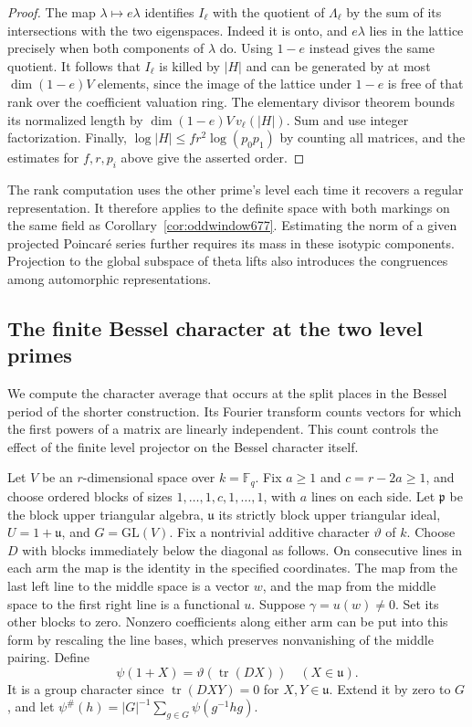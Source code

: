 \documentclass[a4paper,11pt]{article}
\theoremstyle{definition}
\theoremstyle{remark}
\numberwithin{equation}{section}
\begin{document}
\begin{proof}
The map \(\lambda\mapsto e\lambda\) identifies \(I_\ell\) with
the quotient of \(\Lambda_\ell\) by the sum of its intersections
with the two eigenspaces. Indeed it is onto, and \(e\lambda\)
lies in the lattice precisely when both components of \(\lambda\)
do. Using \(1-e\) instead gives the same quotient. It follows
that \(I_\ell\) is killed by \(|H|\) and can be generated by at
most \(\dim(1-e)V\) elements, since the image of the lattice
under \(1-e\) is free of that rank over the coefficient
valuation ring. The elementary divisor theorem bounds its
normalized length by \(\dim(1-e)V\,v_\ell(|H|)\). Sum and use
integer factorization. Finally,
\(\log |H|\le fr^2\log(p_0p_1)\) by counting all matrices, and
the estimates for \(f,r,p_i\) above give the asserted order.
\end{proof}

The rank computation uses the other prime's level each time
it recovers a regular representation. It therefore applies to
the definite space with both markings on the same field as
Corollary~\ref{cor:oddwindow677}. Estimating the norm of a
given projected Poincar\'e series further requires its mass in
these isotypic components. Projection to the global subspace
of theta lifts also introduces the congruences among
automorphic representations.


\subsection{The finite Bessel character at the two level primes}
\label{sec:finitebessel679}

We compute the character average that occurs at the split
places in the Bessel period of the shorter construction. Its
Fourier transform counts vectors for which the first powers of
a matrix are linearly independent. This count controls the
effect of the finite level projector on the Bessel character
itself.

Let \(V\) be an \(r\)-dimensional space over \(k=\mathbb F_q\).
Fix \(a\ge1\) and \(c=r-2a\ge1\), and choose ordered blocks of
sizes \(1,\ldots,1,c,1,\ldots,1\), with \(a\) lines on each
side. Let \(\mathfrak p\) be the block upper triangular algebra,
\(\mathfrak u\) its strictly block upper triangular ideal,
\(U=1+\mathfrak u\), and \(G=\mathrm{GL}(V)\).
Fix a nontrivial additive character \(\vartheta\) of \(k\).
Choose \(D\) with blocks immediately below the diagonal as
follows. On consecutive lines in each arm the map is the
identity in the specified coordinates. The map from the last
left line to the middle space is a vector \(w\), and the map
from the middle space to the first right line is a functional
\(u\). Suppose \(\gamma=u(w)\ne0\). Set its other blocks to
zero. Nonzero coefficients along either arm can be put into
this form by rescaling the line bases, which preserves
nonvanishing of the middle pairing. Define
\[
  \psi(1+X)=\vartheta(\operatorname{tr}(DX))\quad(X\in\mathfrak u).
\]
It is a group character since \(\operatorname{tr}(DXY)=0\)
for \(X,Y\in\mathfrak u\). Extend it by zero to \(G\), and let
\(\psi^\#(h)=|G|^{-1}\sum_{g\in G}\psi(g^{-1}hg)\).
\end{document}
